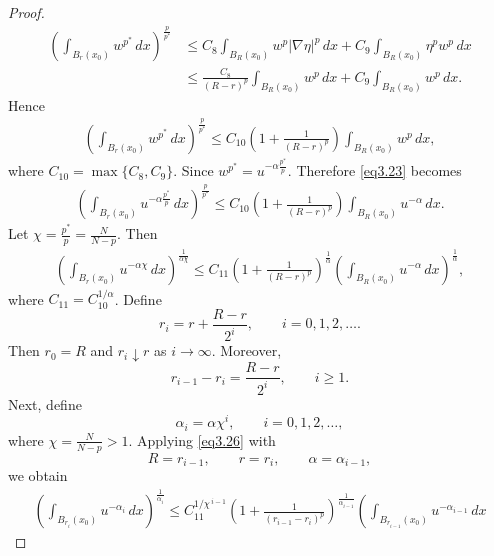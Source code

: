\documentclass[12pt]{extarticle}
\theoremstyle{definition}
\theoremstyle{remark}
\theoremstyle{definition}
\numberwithin{equation}{section}
\numberwithin{equation}{section}
\begin{document}
\begin{proof}
				\begin{align}
					\left(
					\int_{B_r(x_0)}
					w^{p^*}\,dx
					\right)^{\frac{p}{p^*}}
					&\le
					C_8
					\int_{B_R(x_0)}
					w^p|\nabla\eta|^p\,dx
					+
					C_9
					\int_{B_R(x_0)}
					\eta^pw^p\,dx
					\nonumber\\
					&\le
					\frac{C_8}{(R-r)^p}
					\int_{B_R(x_0)}
					w^p\,dx
					+
					C_9
					\int_{B_R(x_0)}
					w^p\,dx.
					\label{eq3.22}
				\end{align}			
				Hence
				\begin{align}
					\left(
					\int_{B_r(x_0)}
					w^{p^*}\,dx
					\right)^{\frac{p}{p^*}}
					\le
					C_{10}
					\left(
					1+\frac1{(R-r)^p}
					\right)
					\int_{B_R(x_0)}
					w^p\,dx,
					\label{eq3.23}
				\end{align}
				where $C_{10}=\max\{C_8,C_9\}$. Since $w^{p^*}=u^{-\alpha\frac{p^*}{p}}$. Therefore \eqref{eq3.23} becomes
				\begin{align}
					\left(
					\int_{B_r(x_0)}
					u^{-\alpha\frac{p^*}{p}}
					\,dx
					\right)^{\frac{p}{p^*}}
					\le
					C_{10}
					\left(
					1+\frac1{(R-r)^p}
					\right)
					\int_{B_R(x_0)}
					u^{-\alpha}\,dx.
					\label{eq3.24}
				\end{align}			
				Let	$\chi=\frac{p^*}{p}=\frac{N}{N-p}$. Then			
				\begin{align}
					\left(
					\int_{B_r(x_0)}
					u^{-\alpha\chi}
					\,dx
					\right)^{\frac1{\alpha\chi}}
					\le
					C_{11}
					\left(
					1+\frac1{(R-r)^p}
					\right)^{\frac1\alpha}
					\left(
					\int_{B_R(x_0)}
					u^{-\alpha}\,dx
					\right)^{\frac1\alpha},
					\label{eq3.26}
				\end{align}
				where $C_{11}	=C_{10}^{1/\alpha}$. Define
				\[
				r_i
				=
				r+\frac{R-r}{2^i},
				\qquad i=0,1,2,\ldots.
				\]
				Then $r_0=R$ and $r_i\downarrow r$ as $i\to\infty$. Moreover,
				\[
				r_{i-1}-r_i
				=
				\frac{R-r}{2^i},
				\qquad i\ge1.
				\]		
				Next, define
				\[
				\alpha_i
				=
				\alpha\chi^i,
				\qquad i=0,1,2,\ldots,
				\]
				where $\chi=\frac{N}{N-p}>1$. Applying \eqref{eq3.26} with
				\[
				R=r_{i-1},
				\qquad
				r=r_i,
				\qquad
				\alpha=\alpha_{i-1},
				\]
				we obtain
				\begin{align}
					\left(
					\int_{B_{r_i}(x_0)}
					u^{-\alpha_i}\,dx
					\right)^{\frac1{\alpha_i}}
					\le
					C_{11}^{1/\chi^{\,i-1}}
					\left(
					1+
					\frac1{(r_{i-1}-r_i)^p}
					\right)^{\frac1{\alpha_{i-1}}}
					\left(
					\int_{B_{r_{i-1}}(x_0)}
					u^{-\alpha_{i-1}}\,dx

\end{align}
\end{proof}
\end{document}
